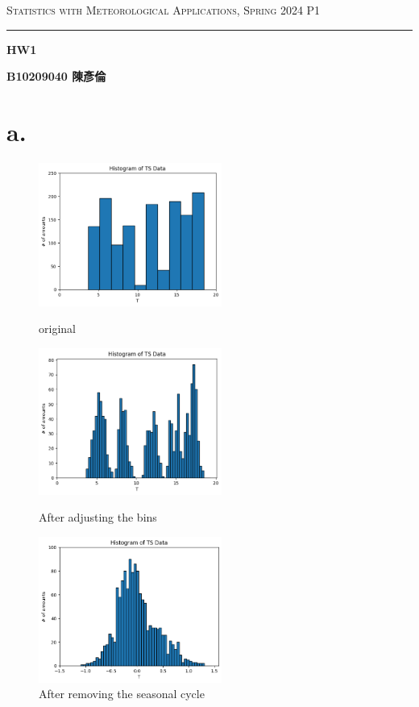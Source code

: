 \documentclass{article}
\author{B10209040 陳彥倫}
\begin{document}
\thispagestyle{empty}
\hfill {\scshape \large Statistics with Meteorological Applications, Spring 2024} \hfill {\scshape P1}
\smallskip
\hrule
\begin{CJK*}{UTF8}{bsmi}
\bigskip
\bigskip
\bigskip

\centerline{\huge \textbf {HW1}}
\bigskip
\centerline{\textbf {B10209040 陳彥倫}}

\section*{a.}
\begin{spacing}{2}
    \begin{large}

    \end{large}
\end{spacing}

\begin{figure}[htbp]
    \centering
    \begin{minipage}[t]{0.48\textwidth}
        \centering
        \includegraphics[width=6cm]{1.png}
        \caption{original}
        \end{minipage}
    \begin{minipage}[t]{0.48\textwidth}
        \centering
        \includegraphics[width=6cm]{2.png}
        \caption{After adjusting the bins}
        \end{minipage}
    \begin{minipage}[t]{0.48\textwidth}
        \centering
        \includegraphics[width=6cm]{3.png}
        \caption{After removing the seasonal cycle}
        \end{minipage}
\end{figure}


\end{CJK*}
\end{document}
